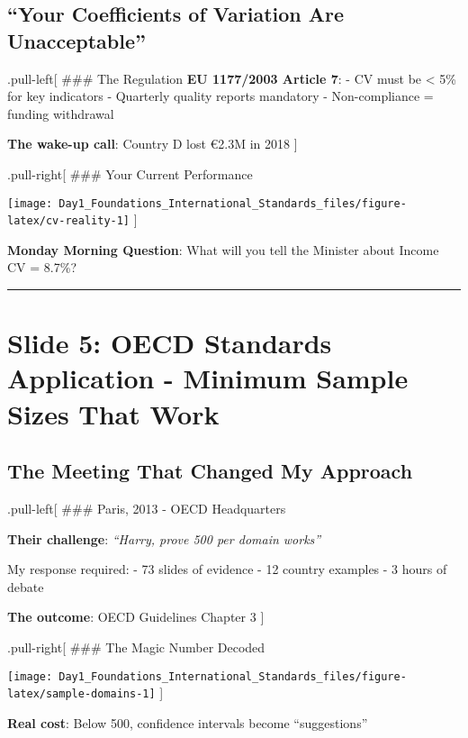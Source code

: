 \documentclass[
]{article}
\begin{document}
\subsection{``Your Coefficients of Variation Are
Unacceptable''}\label{your-coefficients-of-variation-are-unacceptable}

.pull-left{[} \#\#\# The Regulation \textbf{EU 1177/2003 Article 7}: -
CV must be \textless{} 5\% for key indicators - Quarterly quality
reports mandatory - Non-compliance = funding withdrawal

\textbf{The wake-up call}: Country D lost €2.3M in 2018 {]}

.pull-right{[} \#\#\# Your Current Performance

\texttt{[image: Day1\_Foundations\_International\_Standards\_files/figure-latex/cv-reality-1]}
{]}

\textbf{Monday Morning Question}: What will you tell the Minister about
Income CV = 8.7\%?

\begin{center}\rule{0.5\linewidth}{0.5pt}\end{center}

\section{Slide 5: OECD Standards Application - Minimum Sample Sizes That
Work}\label{slide-5-oecd-standards-application---minimum-sample-sizes-that-work}

\subsection{The Meeting That Changed My
Approach}\label{the-meeting-that-changed-my-approach}

.pull-left{[} \#\#\# Paris, 2013 - OECD Headquarters

\textbf{Their challenge}: \emph{``Harry, prove 500 per domain works''}

My response required: - 73 slides of evidence - 12 country examples - 3
hours of debate

\textbf{The outcome}: OECD Guidelines Chapter 3 {]}

.pull-right{[} \#\#\# The Magic Number Decoded

\texttt{[image: Day1\_Foundations\_International\_Standards\_files/figure-latex/sample-domains-1]}
{]}

\textbf{Real cost}: Below 500, confidence intervals become
``suggestions''
\end{document}
